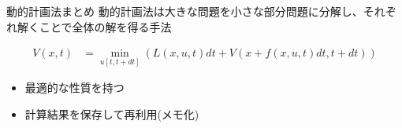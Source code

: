 \documentclass[dvipdfmx,12pt]{beamer}
\begin{document}
    \begin{frame}{動的計画法まとめ}
        動的計画法は大きな問題を小さな部分問題に分解し、それぞれ解くことで全体の解を得る手法

        \begin{tcolorbox}[title=Bellman方程式]
            \begin{align*}
                V(x, t) &= \min_{u[t, t+dt]} \left( L(x, u, t) dt + V \left( x + f(x, u, t) dt, t + dt \right) \right)
            \end{align*}
        \end{tcolorbox}

        \begin{itemize}
            \item 最適的な性質を持つ
            \item 計算結果を保存して再利用(メモ化)
        \end{itemize}
    \end{frame}
\end{document}
